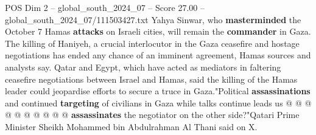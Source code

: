 \begin{textsample}{POS Dim 2 – global\_south\_2024\_07 – Score 27.00 – global\_south\_2024\_07/111503427.txt}
Yahya Sinwar, who \textbf{masterminded} the October 7 Hamas \textbf{attacks} on Israeli cities, will remain the \textbf{commander} in Gaza.
The killing of Haniyeh, a crucial interlocutor in the Gaza ceasefire and hostage negotiations has ended any chance of an imminent agreement, Hamas sources and analysts say.
Qatar and Egypt, which have acted as mediators in faltering ceasefire negotiations between Israel and Hamas, said the killing of the Hamas leader could jeopardise efforts to secure a truce in Gaza."Political \textbf{assassinations} and continued \textbf{targeting} of civilians in Gaza while talks continue leads us @ @ @ @ @ @ @ @ @ @ \textbf{assassinates} the negotiator on the other side?"Qatari Prime Minister Sheikh Mohammed bin Abdulrahman Al Thani said on X.

\end{textsample}

